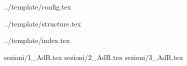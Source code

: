 {../template/config.tex}


\def\DOCUMENTO{Norme di Progetto}
\def\VERSIONE{1.0.0}

\def\DESCRIZIONE{<Info documento>}

\def\REDATTORE {<Redattore>}
\def\VERIFICATORE {<Verificatore>}
\def\RESPONSABILE {<Responsabile>}

\def\USO {<Uso>}

\def\DISTRIBUZIONE {\GRUPPO{}\\ & \COMMITTENTE{}\\}

\def\DESCRIZIONE {Documento riguardante l' Analisi dei Requisiti del gruppo 
StarkLabs per la realizzazione di SiVoDiM.}


\def\INDICE	{true}
\def\TABELLE {true}
\def\FIGURE {true}


 {../template/structure.tex}

 {../template/index.tex}


 {sezioni/1_AdR.tex}
 {sezioni/2_AdR.tex}
 {sezioni/3_AdR.tex}





